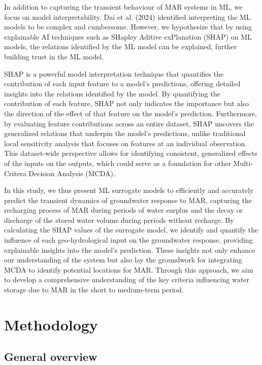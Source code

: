 \documentclass[
]{agujournal2019}
\begin{document}
In addition to capturing the transient behaviour of MAR systems in ML,
we focus on model interpretability. Dai et al. (2024) identified
interpreting the ML models to be complex and cumbersome. However, we
hypothesize that by using explainable AI techniques such as SHapley
Aditive exPlanation (SHAP) on ML models, the relations identified by the
ML model can be explained, further building trust in the ML model.

SHAP is a powerful model interpretation technique that quantifies the
contribution of each input feature to a model's predictions, offering
detailed insights into the relations identified by the model. By
quantifying the contribution of each feature, SHAP not only indicates
the importance but also the direction of the effect of that feature on
the model's prediction. Furthermore, by evaluating feature contributions
across an entire dataset, SHAP uncovers the generalized relations that
underpin the model's predictions, unlike traditional local sensitivity
analysis that focuses on features at an individual observation. This
dataset-wide perspective allows for identifying consistent, generalized
effects of the inputs on the outputs, which could serve as a foundation
for other Multi-Critera Decision Analysis (MCDA).

In this study, we thus present ML surrogate models to efficiently and
accurately predict the transient dynamics of groundwater response to
MAR, capturing the recharging process of MAR during periods of water
surplus and the decay or discharge of the stored water volume during
periods without recharge. By calculating the SHAP values of the
surrogate model, we identify and quantify the influence of each
geo-hydrological input on the groundwater response, providing
explainable insights into the model's prediction. These insights not
only enhance our understanding of the system but also lay the groundwork
for integrating MCDA to identify potential locations for MAR. Through
this approach, we aim to develop a comprehensive understanding of the
key criteria influencing water storage due to MAR in the short to
medium-term period.

\section{Methodology}\label{methodology}

\subsection{General overview}\label{general-overview}
\end{document}
